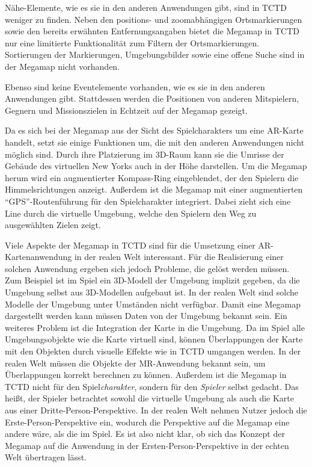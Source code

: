 Nähe-Elemente, wie es sie in den anderen Anwendungen gibt, sind in TCTD weniger zu finden.
Neben den positions- und zoomabhängigen Ortsmarkierungen sowie den bereits erwähnten Entfernungsangaben bietet die Megamap in TCTD nur eine limitierte Funktionalität zum Filtern der Ortsmarkierungen.
Sortierungen der Markierungen, Umgebungsbilder sowie eine offene Suche sind in der Megamap nicht vorhanden.

Ebenso sind keine Eventelemente vorhanden, wie es sie in den anderen Anwendungen gibt.
Stattdessen werden die Positionen von anderen Mitspielern, Gegnern und Missionszielen in Echtzeit auf der Megamap gezeigt.

Da es sich bei der Megamap aus der Sicht des Spielcharakters um eine AR-Karte handelt, setzt sie einige Funktionen um, die mit den anderen Anwendungen nicht möglich sind.
Durch ihre Platzierung im 3D-Raum kann sie die Umrisse der Gebäude des virtuellen New Yorks auch in der Höhe darstellen.
Um die Megamap herum wird ein augmentierter Kompass-Ring eingeblendet, der den Spielern die Himmelsrichtungen anzeigt.
Außerdem ist die Megamap mit einer augmentierten \enquote{GPS}-Routenführung für den Spielcharakter integriert.
Dabei zieht sich eine Line durch die virtuelle Umgebung, welche den Spielern den Weg zu ausgewählten Zielen zeigt.

Viele Aspekte der Megamap in TCTD sind für die Umsetzung einer AR-Kartenanwendung in der realen Welt interessant.
Für die Realisierung einer solchen Anwendung ergeben sich jedoch Probleme, die gelöst werden müssen.
Zum Beispiel ist im Spiel ein 3D-Modell der Umgebung implizit gegeben, da die Umgebung selbst aus 3D-Modellen aufgebaut ist.
In der realen Welt sind solche Modelle der Umgebung unter Umständen nicht verfügbar.
Damit eine Megamap dargestellt werden kann müssen Daten von der Umgebung bekannt sein.
Ein weiteres Problem ist die Integration der Karte in die Umgebung.
Da im Spiel alle Umgebungsobjekte wie die Karte virtuell sind, können Überlappungen der Karte mit den Objekten durch visuelle Effekte wie in TCTD umgangen werden.
In der realen Welt müssen die Objekte der MR-Anwendung bekannt sein, um Überlappungen korrekt berechnen zu können.
Außerdem ist die Megamap in TCTD nicht für den Spiel\emph{charakter}, sondern für den \emph{Spieler} selbst gedacht.
Das heißt, der Spieler betrachtet sowohl die virtuelle Umgebung als auch die Karte aus einer Dritte-Person-Perspektive.
In der realen Welt nehmen Nutzer jedoch die Erste-Person-Perspektive ein, wodurch die Perspektive auf die Megamap eine andere wäre, als die im Spiel.
Es ist also nicht klar, ob sich das Konzept der Megamap auf die Anwendung in der Ersten-Person-Perspektive in der echten Welt übertragen lässt.


